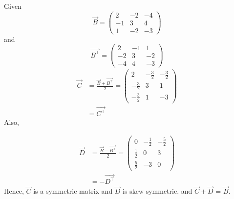 
Given 
\begin{equation}
\vec{B} = 
\begin{pmatrix} 
2 & -2 & -4 \\  -1 & 3 & 4 \\ 1&-2&-3
\end{pmatrix}
\end{equation}
and \begin{equation}
\vec{B^\top} = 
\begin{pmatrix} 
2 & -1 & 1 \\ -2 & 3 & -2 \\ -4 & 4 & -3
\end{pmatrix} 
\end{equation} 
\begin{align}
  \vec{C} &= \frac{\vec{B}+\vec{B^\top}}{2} = \begin{pmatrix} 
2 & -\frac{3}{2} & -\frac{3}{2} \\  -\frac{3}{2} & 3 & 1 \\ -\frac{3}{2}&1&-3
\end{pmatrix}
\\
&=\vec{C^\top}
\label{eq1}
\end{align}
Also,

\begin{align}
\vec{D} &=\frac{\vec{B} - \vec{B^\top}}{2} =
\begin{pmatrix} 
0 & -\frac{1}{2} & -\frac{5}{2} \\  \frac{1}{2} & 0 & 3 \\ \frac{5}{2}&-3&0
\end{pmatrix}\\
&= -\vec{D^\top}
\label{eq2}
\end{align}
Hence, $\vec{C}$ is a symmetric matrix and $\vec{D}$ is skew symmetric.
and $\vec{C} + \vec{D}$ = $\vec{B}$.

